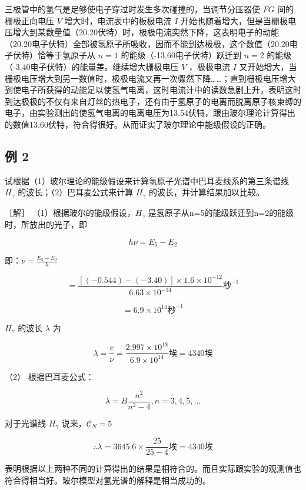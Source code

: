 三极管中的氢气是足够使电子穿过时发生多次碰撞的，当调节分压器使 \(FG\)
间的栅极正向电压 \(V\) 增大时，电流表中的板极电流 \(I\)
开始也随着增大，但是当栅极电压增大到某数量值（20.20伏特）时，极极电流突然下降，这表明电子的动能（20.20电子伏特）全部被氢原子所吸收，因而不能到达极极，这个数值（20.20电子伏特）恰等于氢原子从
\(n = 1\) 的能级（-13.60电子伏特）跃迁到 \(n = 2\)
的能级（-3.40电子伏特）的能量差。继续增大栅极电压 \(V\) ，极极电流 \(I\)
又开始增大，当栅极电压增大到另一数值时，极极电流又再一次骤然下降\ldots\ldots；直到栅极电压增大到使电子所获得的动能足以使氢气电离，这时电流计中的读数急剧上升，表明这时到达极极的不仅有来自灯丝的热电子，还有由于氢原子的电离而脱离原子核束缚的电子，由实验测出的使氢气电离的电离电压为13.54伏特，跟由玻尔理论计算得出的数值13.60伏特，符合得很好。从而证实了玻尔理论中能级假设的正确。

\subsection{例 2}

试根据（1）玻尔理论的能级假设来计算氢原子光谱中巴耳麦线系的第三条谱线
\(H_{\gamma}\) 的波长；（2）巴耳麦公式来计算 \(H_{\gamma}\)
的波长，并计算结果加以比较。

［解］ （1）根据玻尔的能级假设，\(H_{\gamma}\)
是氢原子从n=5的能级跃迁到n=2的能级时，所放出的光子，即

\[
h\nu=E_{5}-E_{2}
\]

即：\(\nu=\frac{E_{5}-E_{2}}{h}\)

\[
= \frac {[ (- 0.544) - (- 3.40) ] \times 1.6\times10^{-12}}{6.63 \times 10 ^ {- 34}} \text{秒} ^ {- 1}
\]

\[
= 6.9 \times 10 ^ {14} \text{秒} ^ {- 1}
\]

\(H_{\gamma}\) 的波长 \(\lambda\) 为

\[
\lambda = \frac {c}{\nu} = \frac {2.997 \times 10 ^ {18}}{6.9 \times 10 ^ {14}} \text{埃} = 4340 \text{埃}
\]

（2） 根据巴耳麦公式：

\[
\lambda = B \frac {n ^ {2}}{n ^ {2} - 4}, n = 3, 4, 5, \dots
\]

对于光谱线 \(H_{\gamma}\) 说来，\(\mathcal{C}_N = 5\)

\[
\therefore \lambda = 3645.6 \times \frac {25}{25 - 4} \text{埃} = 4340 \text{埃}
\]

表明根据以上两种不同的计算得出的结果是相符合的。而且实际跟实验的观测值也符合得相当好。玻尔模型对氢光谱的解释是相当成功的。

